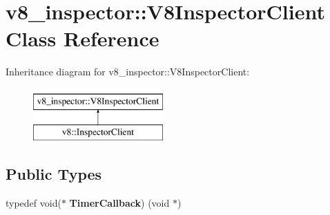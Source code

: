 \hypertarget{classv8__inspector_1_1V8InspectorClient}{}\section{v8\+\_\+inspector\+:\+:V8\+Inspector\+Client Class Reference}
\label{classv8__inspector_1_1V8InspectorClient}
Inheritance diagram for v8\+\_\+inspector\+:\+:V8\+Inspector\+Client\+:\begin{figure}[H]
\begin{center}
\leavevmode
\includegraphics[height=2.000000cm]{classv8__inspector_1_1V8InspectorClient}
\end{center}
\end{figure}
\subsection*{Public Types}
\begin{DoxyCompactItemize}
\item 
\mbox{\label{classv8__inspector_1_1V8InspectorClient_afe9f10304f06f11284ecf8c0d8a3df78}} 
typedef void($\ast$ {\bfseries Timer\+Callback}) (void $\ast$)
\end{DoxyCompactItemize}
